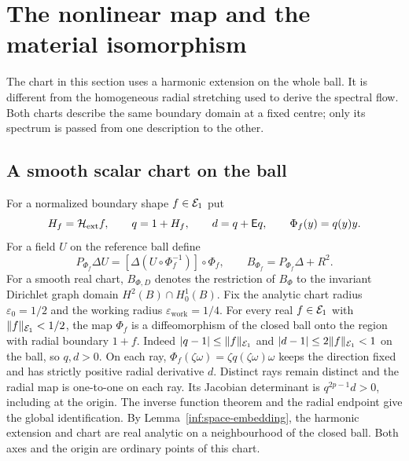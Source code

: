 \section{The nonlinear map and the material isomorphism}\label{inf:sec-material}

The chart in this section uses a harmonic extension on the whole ball.
It is different from the homogeneous radial stretching used to derive
the spectral flow. Both charts describe the same boundary domain at a
fixed centre; only its spectrum is passed from one description to the
other.

\subsection{A smooth scalar chart on the ball}

For a normalized boundary shape $f\in\mathcal E_1$ put
\begin{equation}\label{inf:scalar-chart}
 H_f=\mathcal H_{\mathrm{ext}} f,\qquad q=1+H_f,\qquad d=q+\mathsf E q,
 \qquad \Phi_f(y)=q(y)y.
\end{equation}
For a field $U$ on the reference ball define
\begin{equation}\label{inf:scalar-pullback-definition}
 P_{\Phi_f}\Delta U=
       [\Delta(U\circ\Phi_f^{-1})]\circ\Phi_f,
 \qquad B_{\Phi_f}=P_{\Phi_f}\Delta+R^2.
\end{equation}
For a smooth real chart, $B_{\Phi,D}$ denotes the restriction of
$B_\Phi$ to the invariant Dirichlet graph domain
$H^2(B)\cap H^1_0(B)$.
Fix the analytic chart radius $\varepsilon_0=1/2$ and the
working radius $\varepsilon_{\mathrm{work}}=1/4$.
For every real $f\in\mathcal E_1$ with $\lVert f\rVert_{\mathcal E_1}<1/2$, the map
$\Phi_f$ is a diffeomorphism of the closed ball onto the region
with radial boundary $1+f$.
Indeed $|q-1|\le\lVert f\rVert_{\mathcal E_1}$ and
$|d-1|\le2\lVert f\rVert_{\mathcal E_1}<1$ on the ball, so $q,d>0$.
On each ray, $\Phi_f(\zeta\omega)=\zeta q(\zeta\omega)\omega$
keeps the direction fixed and has strictly positive radial
derivative $d$. Distinct rays remain distinct and the radial
map is one-to-one on each ray. Its Jacobian determinant is
$q^{2p-1}d>0$, including at the origin. The inverse function
theorem and the radial endpoint give the global
identification. By Lemma~\ref{inf:space-embedding}, the harmonic
extension and chart are real analytic on a neighbourhood of
the closed ball. Both axes and the origin are ordinary points
of this chart.

